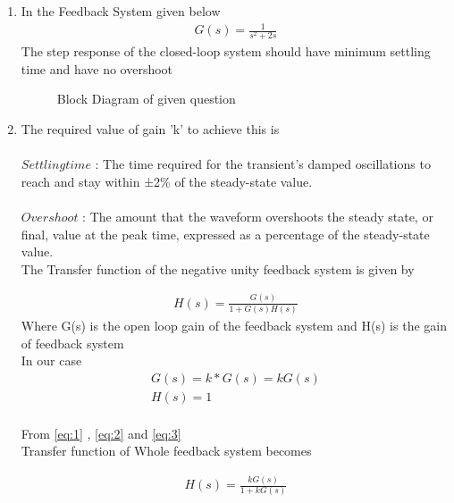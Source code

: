 \begin{enumerate}[label=\thesection.\arabic*.,ref=\thesection.\theenumi]

\item In the Feedback System given below 
\begin{align}
\label{eq:ee18btech11035_G(s)}
 G(s)=\frac{1}{s^2+2s}
\end{align}
The step response of the closed-loop system should have minimum settling time and have no overshoot\\

\begin{figure}[!ht]
    \begin{center}
		
		\resizebox{\columnwidth}{!}{}
	\end{center}
\caption{Block Diagram of given question}
\label{fig:block2}
\end{figure}

\item The required value of gain 'k' to achieve this is\\
\solution \\$Settling time$ : The time required for the transient's damped oscillations to
reach and stay within ±2\% of the steady-state value.\\
\\$Overshoot$ : The amount that the waveform overshoots the steady state, or final, value at the peak time, expressed as a percentage of the steady-state
value.\\

The Transfer function of the negative unity feedback system is given by 

\begin{align}
H(s)=\frac{G(s)}{1+G(s)H(s)}
\label{eq:1}
\end{align}
Where G(s) is the open loop gain of the feedback system and H(s) is the gain of feedback system \\
In our case
 \begin{align}
G(s) = k*G(s) = kG(s)
\label{eq:2}\\
H(s) = 1
\label{eq:3}
\end{align}
\\
From \eqref{eq:1} , \eqref{eq:2} and \eqref{eq:3}\\
Transfer function of Whole feedback system becomes

 \begin{align}
H(s) = \frac{kG(s)}{1+kG(s)}
\label{eq:4}
\end{align}


\end{enumerate}
